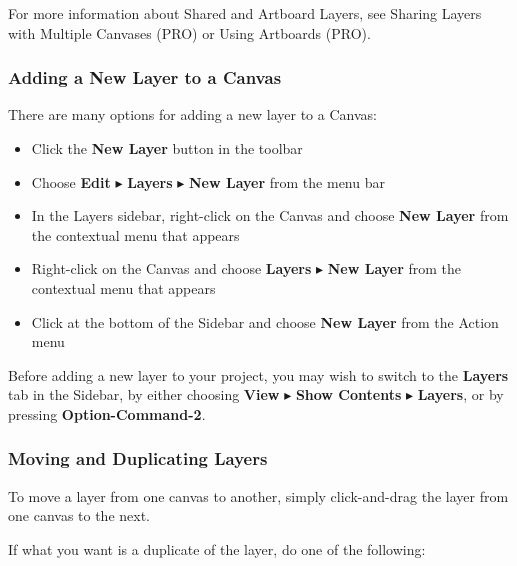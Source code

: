 \documentclass[../main.tex]{subfiles}
\begin{document}
\begin{ognote}
  For more information about Shared and Artboard Layers, see Sharing Layers with Multiple Canvases
  (PRO) or Using Artboards (PRO).
\end{ognote}

\subsubsection{Adding a New Layer to a Canvas}

There are many options for adding a new layer to a Canvas:

\begin{itemize}
  \item Click the \textbf{New Layer} button in the toolbar
  \item Choose \textbf{Edit} $\blacktriangleright$ \textbf{Layers} $\blacktriangleright$
    \textbf{New Layer} from the menu bar
  \item In the Layers sidebar, right-click on the Canvas and choose \textbf{New Layer} from the
    contextual menu that appears
  \item Right-click on the Canvas and choose \textbf{Layers} $\blacktriangleright$ \textbf{New
    Layer} from the contextual menu that appears
  \item Click  at the bottom of the Sidebar and
    choose \textbf{New Layer} from the Action menu
\end{itemize}

\begin{ognote}
  Before adding a new layer to your project, you may wish to switch to the \textbf{Layers} tab in
  the Sidebar, by either choosing \textbf{View} $\blacktriangleright$ \textbf{Show Contents}
  $\blacktriangleright$ \textbf{Layers}, or by pressing \textbf{Option-Command-2}.
\end{ognote}

\subsubsection{Moving and Duplicating Layers}

To move a layer from one canvas to another, simply click-and-drag the layer from one canvas to
the next.

If what you want is a duplicate of the layer, do one of the following:
\end{document}
